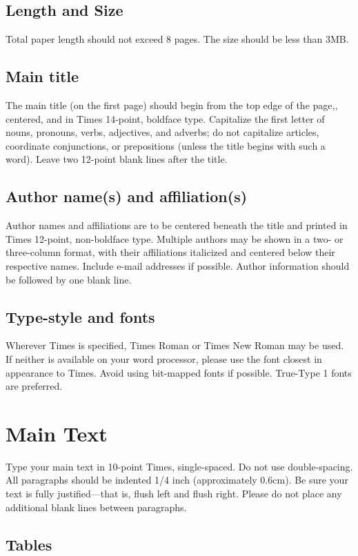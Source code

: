 \documentclass[letter,twocolumn]{article}
\begin{document}
\subsection{Length and Size}
Total paper length should not exceed 8 pages. The size should be less than 3MB.

\subsection{Main title}
The main title (on the first page) should begin from the top edge of the page,, centered, and in Times 14-point, boldface type. Capitalize the first letter of nouns, pronouns, verbs, adjectives, and adverbs; do not capitalize articles, coordinate conjunctions, or prepositions (unless the title begins with such a word). Leave two 12-point blank lines after the title.

\subsection{Author name(s) and affiliation(s)}
Author names and affiliations are to be centered beneath the title and printed in Times 12-point, non-boldface type. Multiple authors may be shown in a two- or three-column format, with their affiliations italicized and centered below their respective names. Include e-mail addresses if possible. Author information should be followed by one blank line.

\subsection{Type-style and fonts}
Wherever Times is specified, Times Roman or Times New Roman may be used. If neither is available on your word processor, please use the font closest in appearance to Times. Avoid using bit-mapped fonts if possible. True-Type 1 fonts are preferred.

\section{Main Text}
Type your main text in 10-point Times, single-spaced. Do not use double-spacing. All paragraphs should be indented 1/4 inch (approximately 0.6cm). Be sure your text is fully justified---that is, flush left and flush right. Please do not place any additional blank lines between paragraphs.

\subsection{Tables}
\end{document}
